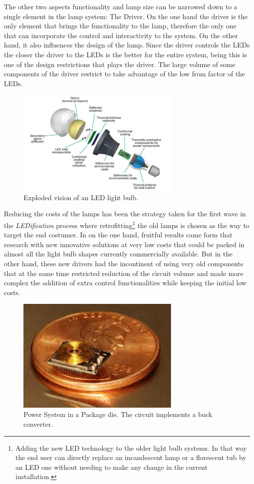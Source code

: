 The other two aspects functionality and lamp size can be narrowed down to a single element in the lamp system: The Driver. On the one hand the driver is the only element that brings the functionality to the lamp, therefore the only one that can incorporate the control and interactivity to the system. On the other hand, it also influences the design of the lamp. Since the driver controls the LEDs the closer the driver to the LEDs is the better for the entire system, being this is one of the design restrictions that plays the driver. The large volume of some components of the driver restrict to take advantage of the low from factor of the LEDs.   


\begin{figure}[!h]
    \centering
    \includegraphics[width=8cm]{./0_intro/img/exploded_bulb_2.jpg}
    \caption{Exploded vision of an LED light bulb.}
    \label{fig:exploded_bulb}
\end{figure}


Reducing the costs of the lamps has been the strategy taken for the first wave in the \emph{LEDification} process where retrofitting\footnote{Adding the new LED technology to the older light bulb systems. In that way the end user can directly replace an incandescent lamp or a florescent tub by an LED one without needing to make any change in the current installation.} the old lamps is chosen as the way to target the end costumer. In on the one hand, fruitful results came form that research with new innovative solutions at very low costs that could be packed in almost all the light bulb shapes currently commercially available. But in the other hand, these new drivers had the incontinent of using very old components that at the same time restricted reduction of the circuit volume and made more complex the addition of extra control functionalities while keeping the initial low costs.

\begin{figure}[!h]
\centering
\includegraphics[width=8cm]{./0_intro/img/FSolzbacher01.jpg}
\caption{Power System in a Package die. The circuit implements a buck converter.}
\label{fig:psoc_example}
\end{figure}

